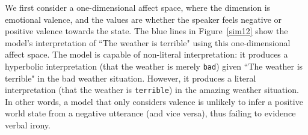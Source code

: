 \documentclass[10pt,letterpaper]{article}
\begin{document}
We first consider a one-dimensional affect space, where the dimension is emotional valence, and the values are whether the speaker feels negative or positive valence towards the state.  
%
%
The blue lines in Figure~\ref{sim12} show the model's interpretation of ``The weather is terrible" using this one-dimensional affect space. 
The model is capable of non-literal interpretation: it produces a hyperbolic interpretation (that the weather is merely \texttt{bad}) given ``The weather is terrible" in the bad weather situation. However, it produces a literal interpretation (that the weather is \texttt{terrible}) in the amazing weather situation. In other words, a model that only considers valence is unlikely to infer a positive world state from a negative utterance (and vice versa), thus failing to evidence verbal irony. 
\end{document}
